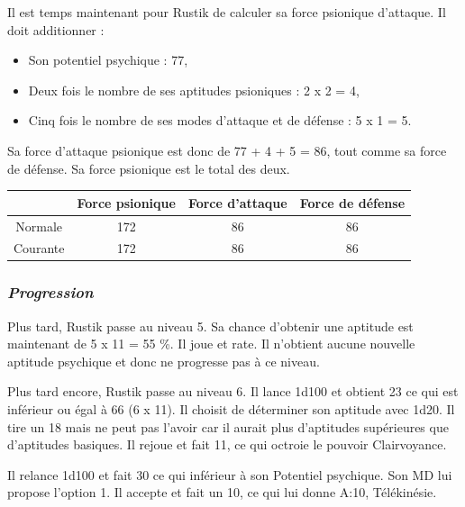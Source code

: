 \documentclass[11pt]{article}
\begin{document}
{Il est temps maintenant pour Rustik de calculer sa force psionique d'attaque. Il doit additionner :

\bigskip

\begin{itemize}
\item Son potentiel psychique : 77,
\item Deux fois le nombre de ses aptitudes psioniques : 2 x 2 = 4,
\item Cinq fois le nombre de ses modes d'attaque et de défense : 5 x 1 = 5.
\end{itemize}

\bigskip

Sa force d'attaque psionique est donc de 77 + 4 + 5 = 86, tout comme sa force de défense. Sa force psionique est le total des deux.

\bigskip

\begin{tabular}{|c|c|c|c|}
\hline
& \textbf{Force psionique} & \textbf{Force d'attaque} & \textbf{Force de défense}  \\ \hline
Normale & 172 & 86 & 86 \\ \hline
Courante & 172 & 86 & 86 \\ \hline
\end{tabular}



\subsubsection*{\textit{Progression}}

Plus tard, Rustik passe au niveau 5. Sa chance d'obtenir une aptitude est maintenant de 5 x 11 = 55 \%. Il joue et rate. Il n'obtient aucune nouvelle aptitude psychique et donc ne progresse pas à ce niveau.

\bigskip

Plus tard encore, Rustik passe au niveau 6. Il lance 1d100 et obtient 23 ce qui est inférieur ou égal à 66 (6 x 11). Il choisit de déterminer son aptitude avec 1d20. Il tire un 18 mais ne peut pas l'avoir car il aurait plus d'aptitudes supérieures que d'aptitudes basiques. Il rejoue et fait 11, ce qui octroie le pouvoir Clairvoyance.

\bigskip

Il relance 1d100 et fait 30 ce qui inférieur à son Potentiel psychique. Son MD lui propose l'option 1. Il accepte et fait un 10, ce qui lui donne A:10, Télékinésie.

}
\end{document}
